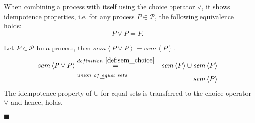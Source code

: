 \begin{theorem}
\label{thm:idempotence_choice}
When combining a process with itself using the choice operator $\vee$, it shows idempotence properties, i.e. for any process $P \in \mathcal{P}$, the following equivalence holds:
\begin{equation*}
  P \vee P = P.
\end{equation*}
\end{theorem}

\begin{myproof}
Let $P \in \mathcal{P}$ be a process, then $sem \left\langle P \vee P \right\rangle = sem \left\langle P \right\rangle$.
\begin{eqnarray*}
  sem \left\langle P \vee P \right\rangle & \overset{\defref{def:sem_choice}}{=} & sem \left\langle P \right\rangle \cup sem \left\langle P \right\rangle \\
  & \overset{union\ of\ equal\ sets}{=} & sem \left\langle P \right\rangle
\end{eqnarray*}
The idempotence property of $\cup$ for equal sets is transferred to the choice operator $\vee$ and hence,  holds.

\hfill$\blacksquare$
\end{myproof}

\begin{myproof}
\end{myproof}

\begin{myproof}
\end{myproof}

\begin{myproof}
\end{myproof}

